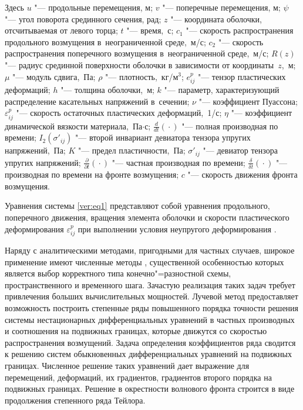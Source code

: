 Здесь $u$ "--- продольные перемещения, м; $v$ "--- поперечные перемещения, м; $\psi$  "--- угол поворота срединного сечения, рад; $z$ "--- координата оболочки, отсчитываемая от левого торца; $t$ "--- время,~с; $c_1$ "--- скорость распространения продольного возмущения в~неограниченной среде,~м/с; 
$c_2$ "--- скорость распространения поперечного возмущения в~неограниченной среде,~м/с; 
$R(z)$ "--- радиус срединной поверхности оболочки в зависимости от координаты~$z$,~м; 
$\mu$ "--- модуль сдвига,~Па; 
$\rho$ "--- плотность,~кг/м$^3$; 
$e_{ij}^p$ "--- тензор пластических деформаций; 
$h$ "--- толщина оболочки,~м; 
$k$ "--- параметр, характеризующий распределение касательных напряжений в~сечении; 
$\nu$ "--- коэффициент Пуассона; 
$\varepsilon_{ij}^p$ "--- скорость остаточных пластических деформаций,~1/с; 
$\eta$ "--- коэффициент динамической вязкости материала,~Па$\cdot$с; 
$\frac{d}{dt}({}\cdot{})$ "--- полная производная по времени; 
$I_2(\sigma'_{ij})$ "--- второй инвариант девиатора тензора упругих напряжений,~Па; 
$K$ "--- предел пластичности,~Па; 
$\sigma'_{ij}$ "--- девиатор тензора упругих напряжений; 
$\frac{\partial}{\partial t} ({}\cdot{})$ "--- частная производная по времени; 
$\frac{\delta}{\delta t} ({}\cdot{})$ "--- производная по времени на фронте возмущения; 
$c$ "--- скорость движения фронта возмущения.

Уравнения системы \eqref{ver:eq1} представляют собой уравнения продольного, поперечного движения, вращения элемента оболочки и скорости пластического деформирования $\varepsilon_{ij}^p$ при выполнении условия неупругого деформирования \cite{ver:bib9}.

Наряду с аналитическими методами, пригодными для частных случаев, широкое применение имеют численные методы \cite{ver:bib5, ver:bib6, ver:bib7}, существенной особенностью которых является выбор корректного типа конечно"=разностной схемы, пространственного и временного шага. Зачастую реализация таких задач требует привлечения больших вычислительных мощностей. Лучевой метод \cite{ver:bib4, ver:bib7,ver:bib8, ver:bib78, ver:bib79, ver:bib9} предоставляет возможность построить степенные ряды повышенного порядка точности решения системы нестационарных дифференциальных уравнений в частных производных и соотношения на подвижных границах, которые движутся со скоростью распространения возмущений. Задача определения коэффициентов ряда сводится к решению систем обыкновенных дифференциальных уравнений на подвижных границах. Численное решение таких уравнений дает выражение для перемещений, деформаций, их градиентов, градиентов второго порядка на подвижных границах. Решение в окрестности волнового фронта строится в виде продолжения степенного ряда Тейлора.


